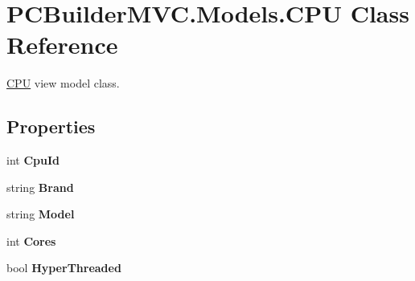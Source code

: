 \hypertarget{class_p_c_builder_m_v_c_1_1_models_1_1_c_p_u}{}\section{P\+C\+Builder\+M\+V\+C.\+Models.\+C\+PU Class Reference}
\label{class_p_c_builder_m_v_c_1_1_models_1_1_c_p_u}


\hyperlink{class_p_c_builder_m_v_c_1_1_models_1_1_c_p_u}{C\+PU} view model class.  


\subsection*{Properties}
\begin{DoxyCompactItemize}
\item 
int {\bfseries Cpu\+Id}\hypertarget{class_p_c_builder_m_v_c_1_1_models_1_1_c_p_u_a990a746196bffb0de705df0e5d05a5f3}{}\label{class_p_c_builder_m_v_c_1_1_models_1_1_c_p_u_a990a746196bffb0de705df0e5d05a5f3}

\item 
string {\bfseries Brand}\hypertarget{class_p_c_builder_m_v_c_1_1_models_1_1_c_p_u_a46f0933a115043582379ed8845692090}{}\label{class_p_c_builder_m_v_c_1_1_models_1_1_c_p_u_a46f0933a115043582379ed8845692090}

\item 
string {\bfseries Model}\hypertarget{class_p_c_builder_m_v_c_1_1_models_1_1_c_p_u_a64cd925d1ab719b2c4519d314c11ae7a}{}\label{class_p_c_builder_m_v_c_1_1_models_1_1_c_p_u_a64cd925d1ab719b2c4519d314c11ae7a}

\item 
int {\bfseries Cores}\hypertarget{class_p_c_builder_m_v_c_1_1_models_1_1_c_p_u_a3b51ddcaba446375f2880e448d22d66f}{}\label{class_p_c_builder_m_v_c_1_1_models_1_1_c_p_u_a3b51ddcaba446375f2880e448d22d66f}

\item 
bool {\bfseries Hyper\+Threaded}\hypertarget{class_p_c_builder_m_v_c_1_1_models_1_1_c_p_u_a4e09d178413e4af0f20b39f275f06591}{}\label{class_p_c_builder_m_v_c_1_1_models_1_1_c_p_u_a4e09d178413e4af0f20b39f275f06591}


\end{DoxyCompactItemize}
